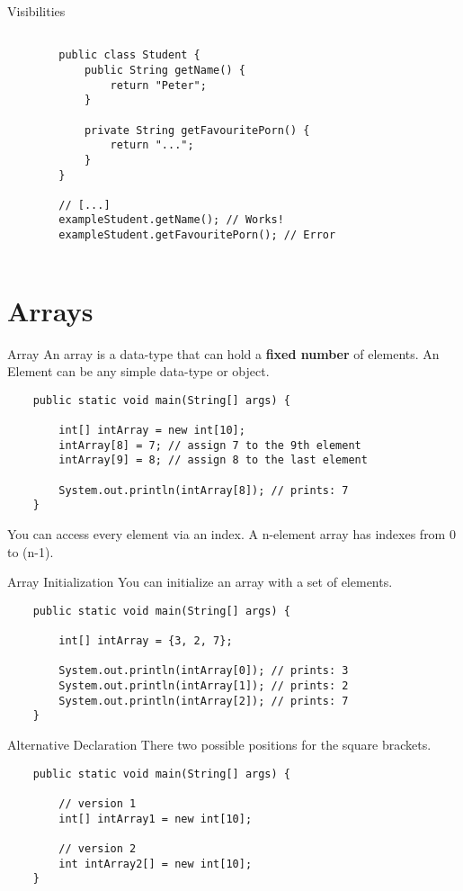 \begin{frame}[fragile]{Visibilities}

	\begin{lstlisting}
	
		public class Student {
			public String getName() {
				return "Peter";
			}
			
			private String getFavouritePorn() {
				return "...";
			}
		}
	
		// [...]
		exampleStudent.getName(); // Works!
		exampleStudent.getFavouritePorn(); // Error
	
	\end{lstlisting}
	
\end{frame}


\section{Arrays}
\begin{frame}[fragile]{Array}
	An array is a data-type that can hold a \textbf{fixed number} of elements. 
	An Element can be any simple data-type or object.
	\begin{lstlisting}
	public static void main(String[] args) {
	
	    int[] intArray = new int[10];
	    intArray[8] = 7; // assign 7 to the 9th element
	    intArray[9] = 8; // assign 8 to the last element
	    
	    System.out.println(intArray[8]); // prints: 7
	}
	\end{lstlisting}
	You can access every element via an index. A n-element array has indexes from 0 to (n-1).
\end{frame}

\begin{frame}[fragile]{Array Initialization} %
	You can initialize an array with a set of elements.
	\begin{lstlisting}
	public static void main(String[] args) {
	
	    int[] intArray = {3, 2, 7};
	    
	    System.out.println(intArray[0]); // prints: 3
	    System.out.println(intArray[1]); // prints: 2
	    System.out.println(intArray[2]); // prints: 7
	}
	\end{lstlisting}
\end{frame}

\begin{frame}[fragile]{Alternative Declaration}
	There two possible positions for the square brackets. 
	\begin{lstlisting}
	public static void main(String[] args) {

	    // version 1	
	    int[] intArray1 = new int[10];
	    
	    // version 2
	    int intArray2[] = new int[10];
	}
	\end{lstlisting}
\end{frame}

